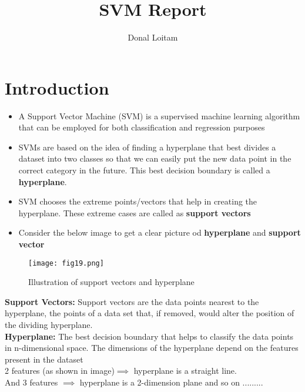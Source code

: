 \documentclass[a4paper, 11pt]{article}
\title{SVM Report}
\author{Donal Loitam}
\begin{document}
\maketitle
\tableofcontents

\section{Introduction}
\begin{itemize}
    \item A Support Vector Machine (SVM) is a supervised machine learning algorithm that can be employed for both classification and regression purposes
    \item  SVMs are based on the idea of finding a hyperplane that best divides a dataset into two classes so that we can easily put the new data point in the 
    correct category in the future. This best decision boundary is called a \textbf{hyperplane}.
    \item SVM chooses the extreme points/vectors that help in creating the hyperplane. These extreme cases are called as \textbf{support vectors}
    \item Consider the below image to get a clear picture od \textbf{hyperplane} and \textbf{support vector}
\end{itemize}
 \begin{figure}[ht!]
    \texttt{[image: fig19.png]}
    \label{fig:fig18}
    \caption{Illustration of support vectors and hyperplane}
  \end{figure}
\pagebreak
\textbf{Support Vectors: }Support vectors are the data points nearest to the hyperplane, the points of a data set that, if removed, would alter the position of the dividing hyperplane.\\
\textbf{Hyperplane: } The best decision boundary that helps to classify the data points in n-dimensional space. The dimensions of the hyperplane
depend on the features present in the dataset\\
2 features (as shown in image)$\implies$ hyperplane is a straight line. \\
And 3 features $\implies$ hyperplane is a 2-dimension plane and so on .........
\end{document}
